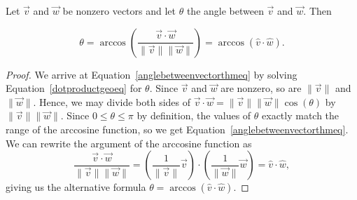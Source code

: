 \begin{theorem}\label{anglebetweenvectorthm} 
Let $\vec{v}$ and $\vec{w}$ be nonzero vectors and let $\theta$ the angle between $\vec{v}$ and $\vec{w}$.  Then 

\begin{equation}
\theta = \arccos\left( \dfrac{\vec{v} \cdot \vec{w}}{\| \vec{v} \| \|\vec{w} \|}\right) = \arccos(\hat{v} \cdot \hat{w}). 
\label{anglebetweenvectorthmeq}
\end{equation}
\end{theorem}

\begin{proof}
We arrive at Equation~\eqref{anglebetweenvectorthmeq} by solving Equation~\eqref{dotproductgeoeq} for $\theta$.  Since $\vec{v}$ and $\vec{w}$ are nonzero, so are $\| \vec{v} \|$ and $\|\vec{w}\|$.  Hence, we may divide both sides of $\vec{v} \cdot \vec{w} = \| \vec{v} \| \|\vec{w} \| \cos(\theta)$ by $\| \vec{v} \| \|\vec{w} \|$.  Since $0 \leq \theta \leq \pi$ by definition, the values of $\theta$ exactly match the range of the arccosine function, so we get Equation~\eqref{anglebetweenvectorthmeq}.   We can rewrite the argument of the arccosine function as
$$ \frac{\vec{v} \cdot \vec{w}}{\| \vec{v} \| \|\vec{w} \|} = \left(\frac{1}{\|\vec{v}\|} \vec{v}\right) \cdot \left(\frac{1}{\|\vec{w}\|} \vec{w}\right) = \hat{v} \cdot \hat{w},$$
giving us the alternative formula $\theta = \arccos(\hat{v} \cdot \hat{w})$.  
\end{proof}

